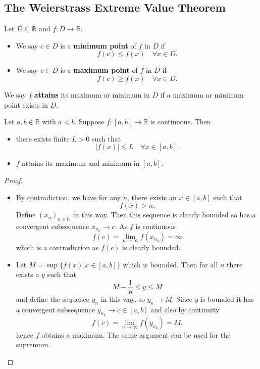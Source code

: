 \subsection{The Weierstrass Extreme Value Theorem}

\begin{definition}
  Let $D \subseteq \mathbb{R}$ and $f : D \rightarrow \mathbb{R}$.
  \begin{itemize}
    \item We say $c \in D$ is a {\bf minimum point} of $f$ in $D$ if 
      \[f(c) \leq f(x) \quad \forall x \in D.\]
  \item We say $c \in D$ is a {\bf maximum point} of $f$ in $D$ if
      \[f(c) \geq f(x) \quad \forall x \in D .\]
  \end{itemize}
  We say $f$ {\bf attains} its maximum or minimum in $D$ if a maximum or minimum point exists in $D$.
\end{definition}

\begin{theorem}
    Let $a, b \in \mathbb{R}$ with $a < b$. Suppose $f : [a, b] \rightarrow \mathbb{R}$ is continuous. Then
    \begin{itemize}
      \item there exists finite $L > 0$ such that
        \[|f(x) | \leq L \quad \forall x \in [a, b].\]
      \item $f$ attains its maximum and minimum in $[a, b]$.
    \end{itemize}
\end{theorem}
\begin{proof} $ $
  \begin{itemize}
    \item By contradiction, we have for any $n$, there exists an $x \in [a,b]$ such that
      \[f(x) > n.\]
      Define $(x_n)_{n \in \mathbb{N}}$ in this way. Then this sequence is clearly bounded so has a convergent subsequence $x_{n_k} \rightarrow c$. As $f$ is continuous
      \[f(c) = \lim_{n \rightarrow \infty} f(x_{n_k}) = \infty\]
      which is a contradiction as $f(c)$ is clearly bounded.
    \item Let $M = \sup \{f(x) | x \in [a, b]\}$ which is bounded. Then for all $n$ there exists a $y$ such that
      \[M - \frac{1}{n} \leq y \leq M\]
      and define the sequence $y_n$ in this way, so $y_n \rightarrow M$. Since $y$ is bounded it has a convergent subsequence $y_{n_k} \rightarrow c \in [a,b]$ and also by continuity
      \[f(c) = \lim_{n \rightarrow \infty} f(y_{n_k}) = M.\]
      hence $f$ obtains a maximum. The same argument can be used for the supremum.
  \end{itemize}    
\end{proof}

